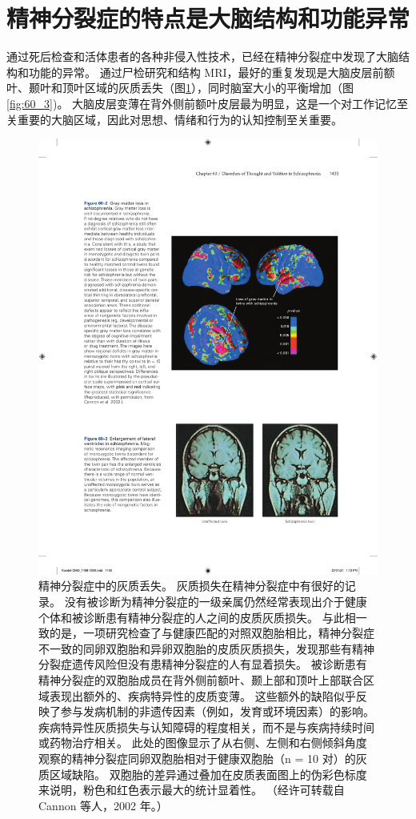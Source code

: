 \section{精神分裂症的特点是大脑结构和功能异常}

通过死后检查和活体患者的各种非侵入性技术，已经在精神分裂症中发现了大脑结构和功能的异常。
通过尸检研究和结构 MRI，最好的重复发现是大脑皮层前额叶、颞叶和顶叶区域的灰质丢失（图\ref{fig:60_2}），同时脑室大小的平衡增加（图 \ref{fig:60_3})。
大脑皮层变薄在背外侧前额叶皮层最为明显，这是一个对工作记忆至关重要的大脑区域，因此对思想、情绪和行为的认知控制至关重要。



\begin{figure}[htbp]
	\centering
	\includegraphics[width=0.7\linewidth]{chap60/fig_60_2}
	\caption{精神分裂症中的灰质丢失。 灰质损失在精神分裂症中有很好的记录。 没有被诊断为精神分裂症的一级亲属仍然经常表现出介于健康个体和被诊断患有精神分裂症的人之间的皮质灰质损失。 与此相一致的是，一项研究检查了与健康匹配的对照双胞胎相比，精神分裂症不一致的同卵双胞胎和异卵双胞胎的皮质灰质损失，发现那些有精神分裂症遗传风险但没有患精神分裂症的人有显着损失。 被诊断患有精神分裂症的双胞胎成员在背外侧前额叶、颞上部和顶叶上部联合区域表现出额外的、疾病特异性的皮质变薄。 这些额外的缺陷似乎反映了参与发病机制的非遗传因素（例如，发育或环境因素）的影响。 疾病特异性灰质损失与认知障碍的程度相关，而不是与疾病持续时间或药物治疗相关。 此处的图像显示了从右侧、左侧和右侧倾斜角度观察的精神分裂症同卵双胞胎相对于健康双胞胎（n = 10 对）的灰质区域缺陷。 双胞胎的差异通过叠加在皮质表面图上的伪彩色标度来说明，粉色和红色表示最大的统计显着性。 （经许可转载自 Cannon 等人，2002 年。）}
	\label{fig:60_2}
\end{figure}


